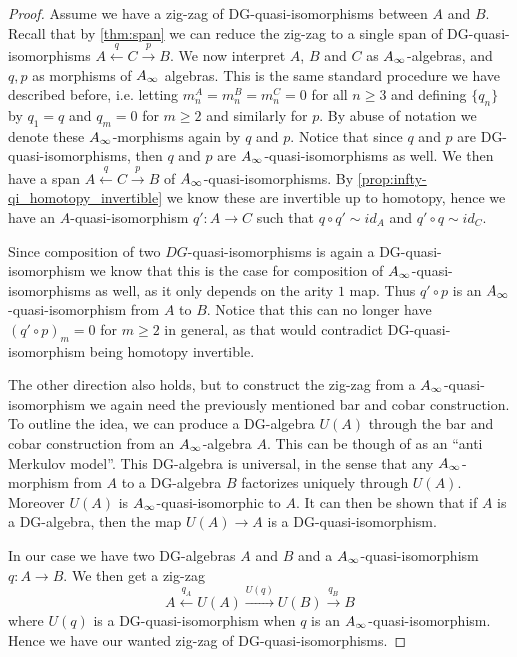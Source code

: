 \begin{proof}
Assume we have a zig-zag of DG-quasi-isomorphisms between $A$ and $B$. Recall that by \cref{thm:span} we can reduce the zig-zag to a single span of DG-quasi-isomorphisms $A\overset{q}\longleftarrow C\overset{p}\longrightarrow B$. We now interpret $A$, $B$ and $C$ as $A_{\infty}$-algebras, and $q, p$ as morphisms of $A_{\infty}$ algebras. This is the same standard procedure we have described before, i.e. letting $m^A_n = m^B_n = m^C_n = 0$ for all $n\geq 3$ and defining $\{q_n\}$ by $q_1 = q$ and $q_m = 0$ for $m\geq 2$ and similarly for $p$. By abuse of notation we denote these $A_{\infty}$-morphisms again by $q$ and $p$. Notice that since $q$ and $p$ are DG-quasi-isomorphisms, then $q$ and $p$ are $A_{\infty}$-quasi-isomorphisms as well. We then have a span $A\overset{q}\longleftarrow C \overset{p}\longrightarrow B$ of $A_{\infty}$-quasi-isomorphisms. By \cref{prop:infty-qi_homotopy_invertible} we know these are invertible up to homotopy, hence we have an $A$-quasi-isomorphism $q'\colon A\longrightarrow C$ such that $q\circ q' \sim id_A$ and $q'\circ q \sim id_C$. 

Since composition of two $DG$-quasi-isomorphisms is again a DG-quasi-isomorphism we know that this is the case for composition of $A_{\infty}$-quasi-isomorphisms as well, as it only depends on the arity $1$ map. Thus $q'\circ p$ is an $A_{\infty}$-quasi-isomorphism from $A$ to $B$. Notice that this can no longer have $(q'\circ p)_m = 0$ for $m\geq 2$ in general, as that would contradict DG-quasi-isomorphism being homotopy invertible. 

The other direction also holds, but to construct the zig-zag from a $A_{\infty}$-quasi-isomorphism we again need the previously mentioned bar and cobar construction. To outline the idea, we can produce a DG-algebra $U(A)$ through the bar and cobar construction from an $A_{\infty}$-algebra $A$. This can be though of as an ``anti Merkulov model''. This DG-algebra is universal, in the sense that any $A_{\infty}$-morphism from $A$ to a DG-algebra $B$ factorizes uniquely through $U(A)$. Moreover $U(A)$ is $A_{\infty}$-quasi-isomorphic to $A$. It can then be shown that if $A$ is a DG-algebra, then the map $U(A)\longrightarrow A$ is a DG-quasi-isomorphism. 

In our case we have two DG-algebras $A$ and $B$ and a $A_{\infty}$-quasi-isomorphism $q\colon A\longrightarrow B$. We then get a zig-zag
\begin{equation*}
    A\overset{q_A}\longleftarrow U(A) \overset{U(q)}\longrightarrow U(B)\overset{q_B}\longrightarrow B
\end{equation*}
where $U(q)$ is a DG-quasi-isomorphism when $q$ is an $A_{\infty}$-quasi-isomorphism. Hence we have our wanted zig-zag of DG-quasi-isomorphisms. 
\end{proof}

